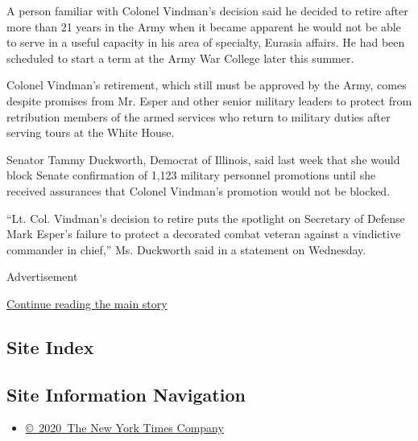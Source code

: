 A person familiar with Colonel Vindman's decision said he decided to
retire after more than 21 years in the Army when it became apparent he
would not be able to serve in a useful capacity in his area of
specialty, Eurasia affairs. He had been scheduled to start a term at the
Army War College later this summer.

Colonel Vindman's retirement, which still must be approved by the Army,
comes despite promises from Mr. Esper and other senior military leaders
to protect from retribution members of the armed services who return to
military duties after serving tours at the White House.

Senator Tammy Duckworth, Democrat of Illinois, said last week that she
would block Senate confirmation of 1,123 military personnel promotions
until she received assurances that Colonel Vindman's promotion would not
be blocked.

``Lt. Col. Vindman's decision to retire puts the spotlight on Secretary
of Defense Mark Esper's failure to protect a decorated combat veteran
against a vindictive commander in chief,'' Ms. Duckworth said in a
statement on Wednesday.

Advertisement

\protect\hyperlink{after-bottom}{Continue reading the main story}

\hypertarget{site-index}{%
\subsection{Site Index}\label{site-index}}

\hypertarget{site-information-navigation}{%
\subsection{Site Information
Navigation}\label{site-information-navigation}}

\begin{itemize}
\tightlist
\item
  \href{https://help.nytimes.com/hc/en-us/articles/115014792127-Copyright-notice}{©~2020~The
  New York Times Company}
\end{itemize}

